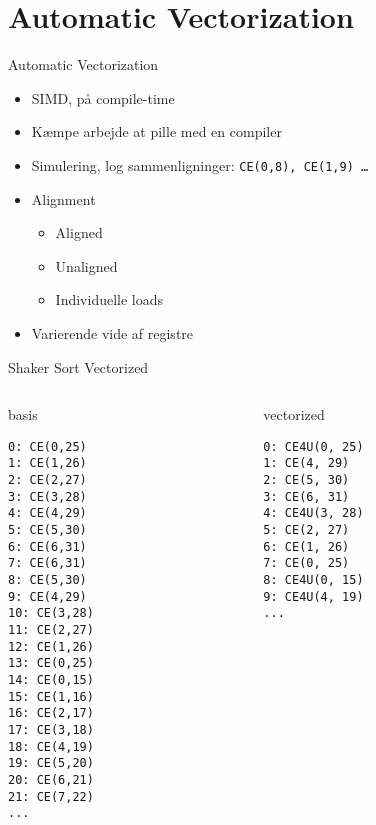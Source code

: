 \section{Automatic Vectorization}

\begin{frame}{Automatic Vectorization}
	\begin{itemize}
		\item SIMD, på compile-time
		\item Kæmpe arbejde at pille med en compiler
		\item Simulering, log sammenligninger: \texttt{CE(0,8), CE(1,9) \dots}
		\item Alignment
			\begin{itemize}
				\item Aligned
				\item Unaligned
				\item Individuelle loads
			\end{itemize}
		\item Varierende vide af registre
	\end{itemize}
\end{frame}

\begin{frame}[fragile]{Shaker Sort Vectorized}
	\begin{columns}
		\begin{column}{0.48\textwidth}
			\begin{block}{basis}
			\tiny
				\begin{verbatim}
0: CE(0,25)
1: CE(1,26)
2: CE(2,27)
3: CE(3,28)
4: CE(4,29)
5: CE(5,30)
6: CE(6,31)
7: CE(6,31)
8: CE(5,30)
9: CE(4,29)
10: CE(3,28)
11: CE(2,27)
12: CE(1,26)
13: CE(0,25)
14: CE(0,15)
15: CE(1,16)
16: CE(2,17)
17: CE(3,18)
18: CE(4,19)
19: CE(5,20)
20: CE(6,21)
21: CE(7,22)
...
				\end{verbatim}
			\end{block}		
		\end{column}
		\begin{column}{0.48\textwidth}
			\begin{block}{vectorized}
			\tiny
				\begin{verbatim}
0: CE4U(0, 25)
1: CE(4, 29)
2: CE(5, 30)
3: CE(6, 31)
4: CE4U(3, 28)
5: CE(2, 27)
6: CE(1, 26)
7: CE(0, 25)
8: CE4U(0, 15)
9: CE4U(4, 19)
...
				\end{verbatim}
				\vspace{2.5cm}
			\end{block}
		\end{column}
	\end{columns}
\end{frame}

